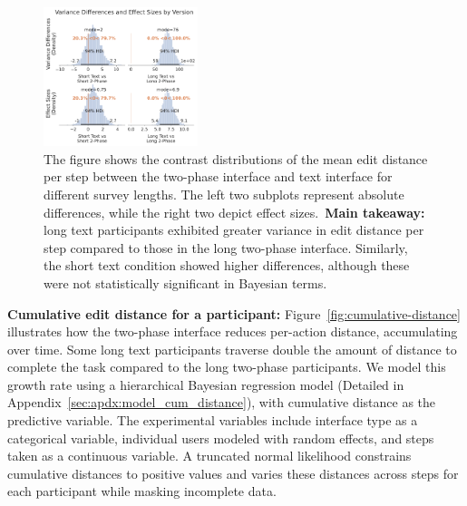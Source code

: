 \begin{figure}[ht!]
    \centering
    \includegraphics[width=0.4\textwidth]{content/image/distance/distance_diff_per_step_effect_size_by_version.pdf}
    \caption{The figure shows the contrast distributions of the mean edit distance per step between the two-phase interface and text interface for different survey lengths. The left two subplots represent absolute differences, while the right two depict effect sizes.~\textbf{Main takeaway:} long text participants exhibited greater variance in edit distance per step compared to those in the long two-phase interface. Similarly, the short text condition showed higher differences, although these were not statistically significant in Bayesian terms.}
    \label{fig:step-over-distance_bayesian}
\end{figure}

\textbf{Cumulative edit distance for a participant:} Figure~\ref{fig:cumulative-distance} illustrates how the two-phase interface reduces per-action distance, accumulating over time. Some long text participants traverse double the amount of distance to complete the task compared to the long two-phase participants. We model this growth rate using a hierarchical Bayesian regression model (Detailed in Appendix~\ref{sec:apdx:model_cum_distance}), with cumulative distance as the predictive variable. The experimental variables include interface type as a categorical variable, individual users modeled with random effects, and steps taken as a continuous variable. A truncated normal likelihood constrains cumulative distances to positive values and varies these distances across steps for each participant while masking incomplete data.

